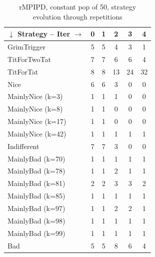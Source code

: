 \documentclass[journal,a4paper,10pt,twoside]{IEEEtran} %
\begin{document}
\begin{table}[ht]
	\caption{rMPIPD, constant pop of 50, strategy evolution through repetitions}
	\label{tab:ripdmp-const}
	\centering
    \begin{tabular}{l|ccccc} \toprule
    	$\downarrow$ Strategy -- Iter $\rightarrow$  & 0 & 1 & 2  & 3  & 4  \\ \midrule
    	GrimTrigger       & 5 & 5 & 4  & 3  & 1  \\
    	TitForTwoTat      & 7 & 7 & 6  & 6  & 4  \\
    	TitForTat         & 8 & 8 & 13 & 24 & 32 \\
    	Nice              & 6 & 6 & 3  & 0  & 0  \\
    	MainlyNice (k=3)  & 1 & 1 & 1  & 0  & 0  \\
    	MainlyNice (k=8)  & 1 & 1 & 0  & 0  & 0  \\
    	MainlyNice (k=17) & 1 & 1 & 0  & 0  & 0  \\
    	MainlyNice (k=42) & 1 & 1 & 1  & 1  & 1  \\
    	Indifferent       & 7 & 7 & 3  & 0  & 0  \\
    	MainlyBad (k=70)  & 1 & 1 & 1  & 1  & 1  \\
    	MainlyBad (k=78)  & 1 & 1 & 2  & 1  & 1  \\
    	MainlyBad (k=81)  & 2 & 2 & 3  & 3  & 2  \\
    	MainlyBad (k=85)  & 1 & 1 & 1  & 1  & 1  \\
    	MainlyBad (k=97)  & 1 & 1 & 2  & 2  & 1  \\
    	MainlyBad (k=98)  & 1 & 1 & 1  & 1  & 1  \\
    	MainlyBad (k=99)  & 1 & 1 & 1  & 1  & 1  \\
    	Bad               & 5 & 5 & 8  & 6  & 4  \\ \bottomrule
    \end{tabular}
\end{table}
\end{document}

